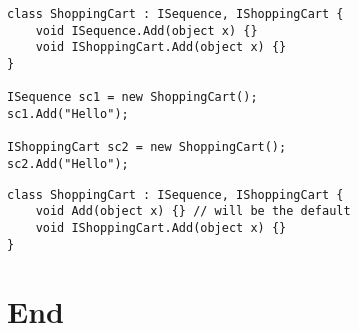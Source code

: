 \documentclass[11pt,twoside,landscape]{article}
\begin{document}
\begin{multicols}{3}
\begin{lstlisting}
class ShoppingCart : ISequence, IShoppingCart {
    void ISequence.Add(object x) {}
    void IShoppingCart.Add(object x) {}
}

ISequence sc1 = new ShoppingCart();
sc1.Add("Hello");

IShoppingCart sc2 = new ShoppingCart();
sc2.Add("Hello");
\end{lstlisting}

\begin{lstlisting}
class ShoppingCart : ISequence, IShoppingCart {
    void Add(object x) {} // will be the default
    void IShoppingCart.Add(object x) {}
}
\end{lstlisting}


\section{End}
\label{sec:org5d2da38}
\end{multicols}
\end{document}

